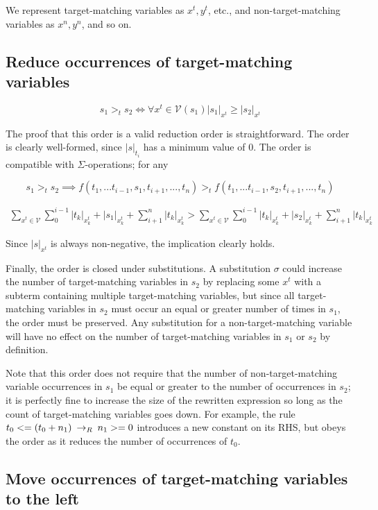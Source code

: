 We represent target-matching variables as $x^t, y^t$, etc., and non-target-matching variables as $x^n, y^n$, and so on.

\subsection{Reduce occurrences of target-matching variables}

\[ s_1 >_t s_2 \iff \forall x^t \in \mathcal{V}(s_1) |s_1|_{x^t} \geq |s_2|_{x^t}
\]

The proof that this order is a valid reduction order is straightforward. The order is clearly well-formed, since $|s|_{t_i}$ has a minimum value of 0. The order is compatible with $\Sigma$-operations; for any

\[ s_1 >_t s_2 \implies f(t_1,...t_{i-1},s_1,t_{i+1},...,t_n) >_t f(t_1,...t_{i-1},s_2,t_{i+1},...,t_n)
\]

\begin{align*}
\sum_{x^t \in \mathcal{V}} \sum_{0}^{i - 1} |t_k|_{x^t_k} + |s_1|_{x^t_k} + \sum_{i + 1}^{n} |t_k|_{x^t_k} >
\sum_{x^t \in \mathcal{V}} \sum_{0}^{i - 1} |t_k|_{x^t_k} + |s_2|_{x^t_k} + \sum_{i + 1}^{n} |t_k|_{x^t_k}
\end{align*}

Since $|s|_{x^t}$ is always non-negative, the implication clearly holds.

Finally, the order is closed under substitutions. A substitution $\sigma$ could increase the number of target-matching variables in $s_2$ by replacing some $x^t$ with a subterm containing multiple target-matching variables, but since all target-matching variables in $s_2$ must occur an equal or greater number of times in $s_1$, the order must be preserved. Any substitution for a non-target-matching variable will have no effect on the number of target-matching variables in $s_1$ or $s_2$ by definition. 

Note that this order does not require that the number of non-target-matching variable occurrences in $s_1$ be equal or greater to the number of occurrences in $s_2$; it is perfectly fine to increase the size of the rewritten expression so long as the count of target-matching variables goes down. For example, the rule $t_0 <= (t_0 + n_1) \:\rightarrow_{R}\: n_1 >= 0$ introduces a new constant on its RHS, but obeys the order as it reduces the number of occurrences of $t_0$.

\subsection{Move occurrences of target-matching variables to the left}

